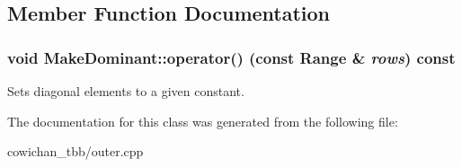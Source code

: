 \subsection{Member Function Documentation}
\hypertarget{class_make_dominant_79c1af1cd1e60a39f5385409209c6cef}{
\subsubsection[{operator()}]{\setlength{\rightskip}{0pt plus 5cm}void MakeDominant::operator() (const {\bf Range} \& {\em rows}) const}}
\label{class_make_dominant_79c1af1cd1e60a39f5385409209c6cef}


Sets diagonal elements to a given constant. 

The documentation for this class was generated from the following file:\begin{CompactItemize}
\item 
cowichan\_\-tbb/outer.cpp\end{CompactItemize}
